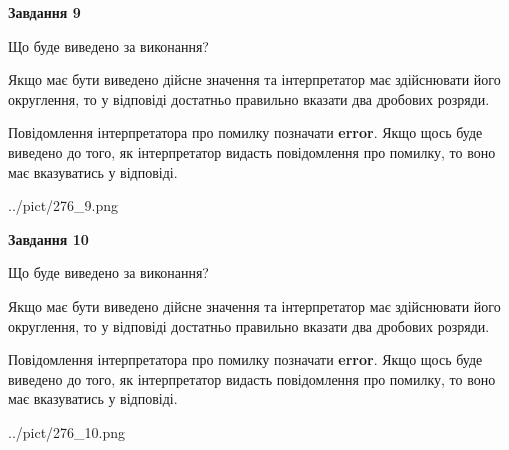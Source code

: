 \documentclass[12pt, ukrainian]{article}
\begin{document}
{\begin {Large}
{\begin {center}\textbf{Завдання 9}\end {center}}\par
Що буде виведено за виконання? \par

Якщо має бути виведено дійсне значення та інтерпретатор має здійснювати його округлення, 
то у відповіді достатньо правильно вказати два дробових розряди.

Повідомлення інтерпретатора про помилку позначати \textbf{error}.
Якщо щось буде виведено до того, як інтерпретатор видасть повідомлення про помилку, 
то воно має вказуватись у відповіді. \par

\begin{center}
	{../pict/276_9.png}
\end{center}
\newpage

{\begin {center}\textbf{Завдання 10}\end {center}}\par
Що буде виведено за виконання? \par

Якщо має бути виведено дійсне значення та інтерпретатор має здійснювати його округлення, 
то у відповіді достатньо правильно вказати два дробових розряди.

Повідомлення інтерпретатора про помилку позначати \textbf{error}.
Якщо щось буде виведено до того, як інтерпретатор видасть повідомлення про помилку, 
то воно має вказуватись у відповіді. \par

\begin{center}
	{../pict/276_10.png}
\end{center}
\newpage

\end {Large}}
\end{document}
